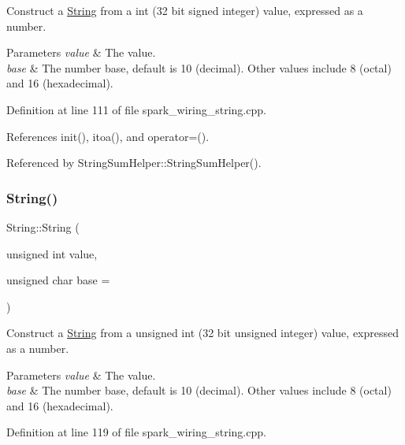 Construct a \hyperlink{class_string}{String} from a int (32 bit signed integer) value, expressed as a number. 


\begin{DoxyParams}{Parameters}
{\em value} & The value.\\
\hline
{\em base} & The number base, default is 10 (decimal). Other values include 8 (octal) and 16 (hexadecimal). \\
\hline
\end{DoxyParams}


Definition at line 111 of file spark\+\_\+wiring\+\_\+string.\+cpp.



References init(), itoa(), and operator=().



Referenced by String\+Sum\+Helper\+::\+String\+Sum\+Helper().

\mbox{\label{class_string_a53134e2b38eb0d114f886e807a3753ae}} 
\subsubsection{\texorpdfstring{String()}{String()}\hspace{0.1cm}{\footnotesize\ttfamily [9/13]}}
{\footnotesize\ttfamily String\+::\+String (\begin{DoxyParamCaption}\item[{unsigned int}]{value,  }\item[{unsigned char}]{base = {} }\end{DoxyParamCaption})\hspace{0.3cm}{\ttfamily [explicit]}}



Construct a \hyperlink{class_string}{String} from a unsigned int (32 bit unsigned integer) value, expressed as a number. 


\begin{DoxyParams}{Parameters}
{\em value} & The value.\\
\hline
{\em base} & The number base, default is 10 (decimal). Other values include 8 (octal) and 16 (hexadecimal). \\
\hline
\end{DoxyParams}


Definition at line 119 of file spark\+\_\+wiring\+\_\+string.\+cpp.



